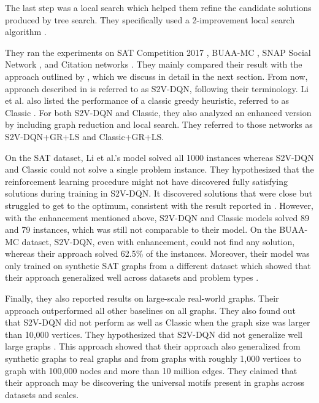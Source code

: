 \documentclass{article}
\begin{document}
The last step was a local search which helped them refine the candidate solutions produced by tree search. They specifically used a 2-improvement local search algorithm \cite{andrade2012fast, feo1994greedy}. 

They ran the experiments on SAT Competition 2017 \cite{satcompetition2017}, BUAA-MC \cite{xu2007random}, SNAP Social Network \cite{stanfordlargenetworkdatasetcollection}, and Citation networks \cite{sen2008collective}. They mainly compared their result with the approach outlined by \cite{khalil2017learning}, which we discuss in detail in the next section. From now, approach described in \cite{khalil2017learning} is referred to as S2V-DQN, following their terminology. Li et al. also listed the performance of a classic greedy heuristic, referred to as Classic \cite{papadimitriou1998combinatorial}. For both S2V-DQN and Classic, they also analyzed an enhanced version by including graph reduction and local search. They referred to those networks as S2V-DQN+GR+LS and Classic+GR+LS. 

On the SAT dataset, Li et al.'s model solved all 1000 instances whereas S2V-DQN and Classic could not solve a single problem instance. They hypothesized that the reinforcement learning procedure might not have discovered fully satisfying solutions during training in S2V-DQN. It discovered solutions that were close but struggled to get to the optimum, consistent with the result reported in \cite{khalil2017learning}. However, with the enhancement mentioned above, S2V-DQN and Classic models solved 89 and 79 instances, which was still not comparable to their model. On the BUAA-MC dataset, S2V-DQN, even with enhancement, could not find any solution, whereas their approach solved 62.5\% of the instances. Moreover, their model was only trained on synthetic SAT graphs from a different dataset which showed that their approach generalized well across datasets and problem types \cite{li2018combinatorial}. 

Finally, they also reported results on large-scale real-world graphs. Their approach outperformed all other baselines on all graphs. They also found out that S2V-DQN did not perform as well as Classic when the graph size was larger than 10,000 vertices. They hypothesized that S2V-DQN did not generalize well large graphs \cite{li2018combinatorial}. This approach showed that their approach also generalized from synthetic graphs to real graphs and from graphs with roughly 1,000 vertices to graph with 100,000 nodes and more than 10 million edges. They claimed that their approach may be discovering the universal motifs present in graphs across datasets and scales.  
\end{document}
